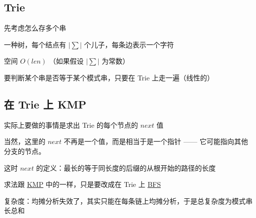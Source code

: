 
\subsection{Trie}

先考虑怎么存多个串

一种树，每个结点有 $|∑|$ 个儿子，每条边表示一个字符

空间 $O(len)$ （如果假设 $|∑|$ 为常数）

要判断某个串是否等于某个模式串，只要在 Trie 上走一遍（线性的）

\subsection{在 Trie 上 KMP}

实际上要做的事情是求出 Trie 的每个节点的 $next$ 值

当然，这里的 $next$ 不再是一个值，而是相当于是一个指针 —— 它可能指向其他分支的节点。

这时 $next$ 的定义：最长的等于同长度的后缀的从根开始的路径的长度

求法跟 \href{/string/kmp}{KMP} 中的一样，只是要改成在 Trie 上 \href{/search/bfs}{BFS}

复杂度：均摊分析失效了，其实只能在每条链上均摊分析，于是总复杂度为模式串长总和

